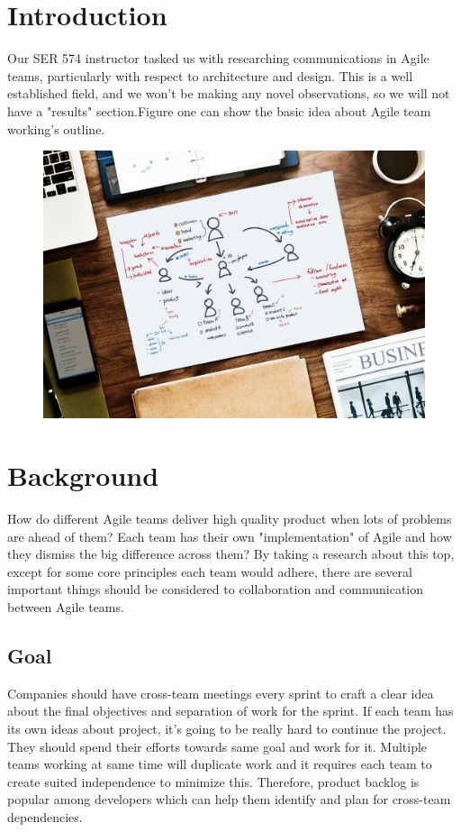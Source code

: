 \documentclass[sigplan,screen]{acmart}
\begin{document}
\section{Introduction}
Our SER 574 instructor tasked us with researching communications in Agile teams, particularly with respect to architecture and design. This is a well established field, and we won't be making any novel observations, so we will not have a "results" section.Figure one can show the basic idea about Agile team working's outline. 
\begin{figure}[t]
\centering
\includegraphics[scale=0.07]{Agile process}
\end{figure}

\section{Background}
How do different Agile teams deliver high quality product when lots of problems are ahead of them? Each team has their own "implementation" of Agile and how they dismiss the big difference across them? By taking a research about this top, except for some core principles each team would adhere, there are several important things should be considered to collaboration and communication between Agile teams.

\subsection{Goal}
Companies should have cross-team meetings every sprint to craft a clear idea about the final objectives and separation of work for the sprint. If each team has its own ideas about project, it's going to be really hard to continue the project. They should spend their efforts towards same goal and work for it. Multiple teams working at same time will duplicate work and it requires each team to create suited independence to minimize this. Therefore, product backlog is popular among developers which can help them identify and plan for cross-team dependencies.
\end{document}
